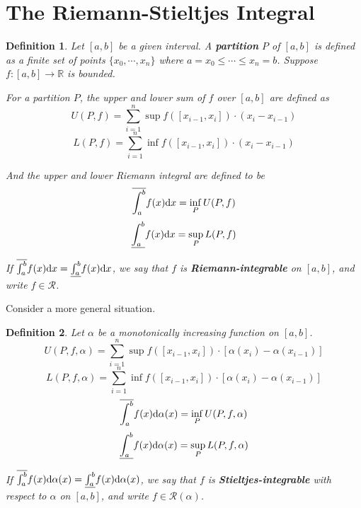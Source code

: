 \documentclass[aps,pra,onecolumn,notitlepage,superscriptaddress]{revtex4-1}
\newcommand{\R}{\mathbb{R}}
\def\d{{\rm d}}
\newtheorem{defi}{Definition}
\begin{document}
    \section{The Riemann-Stieltjes Integral}
    \begin{defi}
        Let $[a,b]$ be a given interval. A \textbf{partition} $P$ of $[a,b]$ is defined as a finite set of points $\{ x_0, \cdots, x_n \}$ where $a = x_0 \leq \cdots \leq x_n = b$. Suppose $f: [a,b] \to \R$ is bounded. 
        
        For a partition $P$, the upper and lower sum of $f$ over $[a,b]$ are defined as
        \begin{equation}
            U(P,f) = \sum_{i=1}^n \sup f([x_{i-1}, x_i]) \cdot (x_i - x_{i-1})
        \end{equation}
        \begin{equation}
            L(P,f) = \sum_{i=1}^n \inf f([x_{i-1}, x_i]) \cdot (x_i - x_{i-1})
        \end{equation}
        
    And the upper and lower Riemann integral are defined to be
    \begin{equation}
        \overline{\int_a^b} f(x) \d x = \inf_P U(P, f)
    \end{equation}
    \begin{equation}
        \underline{\int_a^b} f(x) \d x = \sup_P L(P, f)
    \end{equation}

    If $\overline{\int_a^b} f(x) \d x = \underline{\int_a^b} f(x) \d x$, we say that $f$ is \textbf{Riemann-integrable} on $[a,b]$, and write $f \in \mathscr{R}$.
    \end{defi}

    Consider a more general situation.
    \begin{defi}
        Let $\alpha$ be a monotonically increasing function on $[a,b]$.
        \begin{equation}
            U(P,f,\alpha) = \sum_{i=1}^n \sup f([x_{i-1}, x_i]) \cdot [\alpha(x_i) - \alpha(x_{i-1})]
        \end{equation}
        \begin{equation}
            L(P,f,\alpha) = \sum_{i=1}^n \inf f([x_{i-1}, x_i]) \cdot [\alpha(x_i) - \alpha(x_{i-1})]
        \end{equation}
        \begin{equation}
            \overline{\int_a^b} f(x) \d \alpha(x) = \inf_P U(P, f, \alpha)
        \end{equation}
        \begin{equation}
            \underline{\int_a^b} f(x) \d \alpha(x) = \sup_P L(P, f, \alpha)
        \end{equation}

        If $\overline{\int_a^b} f(x) \d \alpha(x) = \underline{\int_a^b} f(x) \d \alpha(x)$, we say that $f$ is \textbf{Stieltjes-integrable} with respect to $\alpha$ on $[a,b]$, and write $f \in \mathscr{R}(\alpha)$.
    \end{defi}
\end{document}
